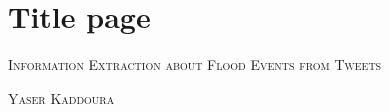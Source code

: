 \documentclass[a4paper, 12pt]{report}
\begin{document}

\thispagestyle{empty}
\section*{Title page}

\textsc{\large Information Extraction about Flood Events from Tweets}

\textsc{\large Yaser Kaddoura}

\newpage\null\thispagestyle{blank}\newpage

\thispagestyle{empty}


\newpage\null\thispagestyle{blank}\newpage

\tableofcontents

\newpage

\listoffigures

\newpage

\listoftables
\newpage



\newpage




\newpage



\newpage



\newpage



\newpage



\newpage



\newpage



\newpage

\printbibliography[heading=bibintoc, title={References}]
\end{document}
